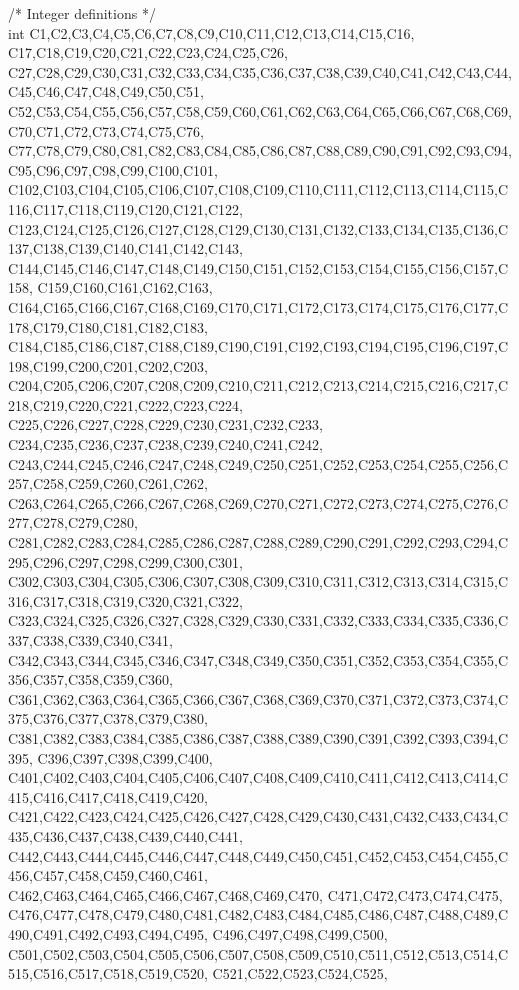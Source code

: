 /* Integer definitions */ \\
int C1,C2,C3,C4,C5,C6,C7,C8,C9,C10,C11,C12,C13,C14,C15,C16, C17,C18,C19,C20,C21,C22,C23,C24,C25,C26, C27,C28,C29,C30,C31,C32,C33,C34,C35,C36,C37,C38,C39,C40,C41,C42,C43,C44,C45,C46,C47,C48,C49,C50,C51, C52,C53,C54,C55,C56,C57,C58,C59,C60,C61,C62,C63,C64,C65,C66,C67,C68,C69,C70,C71,C72,C73,C74,C75,C76,
C77,C78,C79,C80,C81,C82,C83,C84,C85,C86,C87,C88,C89,C90,C91,C92,C93,C94,C95,C96,C97,C98,C99,C100,C101,
C102,C103,C104,C105,C106,C107,C108,C109,C110,C111,C112,C113,C114,C115,C116,C117,C118,C119,C120,C121,C122,
C123,C124,C125,C126,C127,C128,C129,C130,C131,C132,C133,C134,C135,C136,C137,C138,C139,C140,C141,C142,C143,
C144,C145,C146,C147,C148,C149,C150,C151,C152,C153,C154,C155,C156,C157,C158, C159,C160,C161,C162,C163,
C164,C165,C166,C167,C168,C169,C170,C171,C172,C173,C174,C175,C176,C177,C178,C179,C180,C181,C182,C183, C184,C185,C186,C187,C188,C189,C190,C191,C192,C193,C194,C195,C196,C197,C198,C199,C200,C201,C202,C203,
C204,C205,C206,C207,C208,C209,C210,C211,C212,C213,C214,C215,C216,C217,C218,C219,C220,C221,C222,C223,C224,
C225,C226,C227,C228,C229,C230,C231,C232,C233, C234,C235,C236,C237,C238,C239,C240,C241,C242,
C243,C244,C245,C246,C247,C248,C249,C250,C251,C252,C253,C254,C255,C256,C257,C258,C259,C260,C261,C262, C263,C264,C265,C266,C267,C268,C269,C270,C271,C272,C273,C274,C275,C276,C277,C278,C279,C280, C281,C282,C283,C284,C285,C286,C287,C288,C289,C290,C291,C292,C293,C294,C295,C296,C297,C298,C299,C300,C301,
C302,C303,C304,C305,C306,C307,C308,C309,C310,C311,C312,C313,C314,C315,C316,C317,C318,C319,C320,C321,C322,
C323,C324,C325,C326,C327,C328,C329,C330,C331,C332,C333,C334,C335,C336,C337,C338,C339,C340,C341,
C342,C343,C344,C345,C346,C347,C348,C349,C350,C351,C352,C353,C354,C355,C356,C357,C358,C359,C360,
C361,C362,C363,C364,C365,C366,C367,C368,C369,C370,C371,C372,C373,C374,C375,C376,C377,C378,C379,C380,
C381,C382,C383,C384,C385,C386,C387,C388,C389,C390,C391,C392,C393,C394,C395, C396,C397,C398,C399,C400,
C401,C402,C403,C404,C405,C406,C407,C408,C409,C410,C411,C412,C413,C414,C415,C416,C417,C418,C419,C420, C421,C422,C423,C424,C425,C426,C427,C428,C429,C430,C431,C432,C433,C434,C435,C436,C437,C438,C439,C440,C441,
C442,C443,C444,C445,C446,C447,C448,C449,C450,C451,C452,C453,C454,C455,C456,C457,C458,C459,C460,C461,
C462,C463,C464,C465,C466,C467,C468,C469,C470, C471,C472,C473,C474,C475,
C476,C477,C478,C479,C480,C481,C482,C483,C484,C485,C486,C487,C488,C489,C490,C491,C492,C493,C494,C495, C496,C497,C498,C499,C500,
C501,C502,C503,C504,C505,C506,C507,C508,C509,C510,C511,C512,C513,C514,C515,C516,C517,C518,C519,C520, C521,C522,C523,C524,C525,
